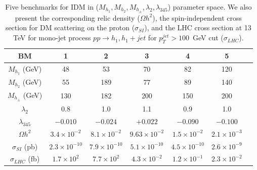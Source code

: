 \begin{table}[htb]
	\centering
	\begin{tabular}{|c||c|c|c|c|c|c|}
		\hline
		{\bf BM}                       &  {\bf 1}  & {\bf 2}  & {\bf 3}  & {\bf 4}  &  {\bf 5}  \\
		\hline\hline 
		$M_{h_{1}}$ (GeV)     & 48      	& 53 		& 70 		& 82 	&120 \\
		\hline
		$M_{h_{2}}$ (GeV)     & 55      	& 189 		& 77  		&  89  & 140 \\
		\hline
		$M_{h_{\pm}}$ (GeV)   & 130     	& 182 		& 200  	&  150  &  200 \\
		\hline
		$\lambda_{2}$         &  0.8    	& 1.0 		& 1.1 		& 0.9 	& 1.0 \\ 
		\hline
		$\lambda_{345}$       & $-0.010$ 	& $-0.024$  	& $+0.022$ 	& $-0.090$  & $-0.100$      \\
		\hline
		$\Omega h^2$          & $3.4 \times 10^{-2}$ & $8.1 \times 10^{-2}$  & $9.63 \times 10^{-2}$  & $1.5 \times 10^{-2}$  &  $2.1 \times 10^{-3}$ \\
		\hline 
		$\sigma_{SI}$ (pb)   & $2.3 \times 10^{-10}$ &  $7.9 \times 10^{-10}$  & $5.1 \times 10^{-10}$  & $4.5 \times 10^{-10}$  &  $2.6 \times 10^{-9}$ \\
		\hline 
		$\sigma_{LHC}$ (fb)     & $1.7 \times 10^{2}$ &  $7.7 \times 10^{2}$  & $4.3 \times 10^{-2}$  & $1.2 \times 10^{-1}$  &  $2.3 \times 10^{-2}$ \\
		\hline\hline
	\end{tabular}
	\caption{Five benchmarks for IDM in  ($M_{h_{1}},M_{h_{2}},M_{h_{\pm}},\lambda_{2},\lambda_{345}$) parameter space.
		We also present the corresponding relic density ($\Omega h^2$), the spin-independent cross section for DM scattering on the proton ($\sigma_{SI}$),
		and the LHC cross section at 13 TeV for mono-jet process $pp\to h_1,h_1+jet$ for $p_T^{jet}>100$~GeV cut ($\sigma_{LHC}$).}
	\label{tab:i2HDMbenchMarks}
\end{table}


